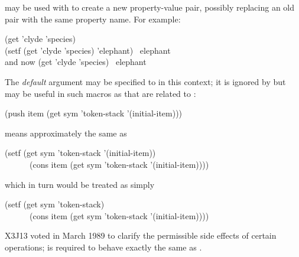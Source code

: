 \begin{defun}[Function]
 may be used with  to create a new property-value
pair, possibly replacing an old pair with the same property name.
For example:
\begin{lisp}
(get 'clyde 'species) \EV\ {\false} \\
(setf (get 'clyde 'species) 'elephant) \EV\ elephant \\
{\rm and now} (get 'clyde 'species) \EV\ elephant
\end{lisp}
The {\it default} argument may be
specified to  in this context; it is ignored by  but
may be useful in such macros as  that are related to :
\begin{lisp}
(push item (get sym 'token-stack '(initial-item)))
\end{lisp}
means approximately the same as
\begin{lisp}
(setf (get sym 'token-stack '(initial-item)) \\
~~~~~~(cons item (get sym 'token-stack '(initial-item))))
\end{lisp}
which in turn would be treated as simply
\begin{lisp}
(setf (get sym 'token-stack) \\
~~~~~~(cons item (get sym 'token-stack '(initial-item))))
\end{lisp}

\begin{newer}
X3J13 voted in March 1989 
to clarify the permissible side effects of certain operations;
is required to behave exactly the same as
.
\end{newer}

\end{defun}

